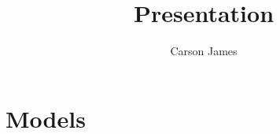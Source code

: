 \documentclass[notheorems]{beamer}
\title{Presentation}
\author{Carson James}
\theoremstyle{definition}
\begin{document}
\frame{\titlepage}


%	


\section{Models}
\end{document}
